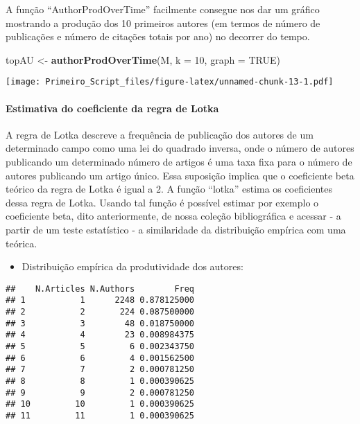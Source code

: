 \documentclass[]{article}
\newenvironment{Shaded}{\begin{snugshade}}{\end{snugshade}}
\newcommand{\DataTypeTok}[1]{\textcolor[rgb]{0.13,0.29,0.53}{#1}}
\newcommand{\DecValTok}[1]{\textcolor[rgb]{0.00,0.00,0.81}{#1}}
\newcommand{\KeywordTok}[1]{\textcolor[rgb]{0.13,0.29,0.53}{\textbf{#1}}}
\newcommand{\NormalTok}[1]{#1}
\newcommand{\OperatorTok}[1]{\textcolor[rgb]{0.81,0.36,0.00}{\textbf{#1}}}
\newcommand{\OtherTok}[1]{\textcolor[rgb]{0.56,0.35,0.01}{#1}}
\newcommand{\StringTok}[1]{\textcolor[rgb]{0.31,0.60,0.02}{#1}}
\providecommand{\tightlist}{%
  \setlength{\itemsep}{0pt}\setlength{\parskip}{0pt}}
\let\oldparagraph\paragraph
\renewcommand{\paragraph}[1]{\oldparagraph{#1}\mbox{}}
\begin{document}
A função ``AuthorProdOverTime'' facilmente consegue nos dar um gráfico
mostrando a produção dos 10 primeiros autores (em termos de número de
publicações e número de citações totais por ano) no decorrer do tempo.

\begin{Shaded}
\begin{Highlighting}[]
\NormalTok{topAU <-}\StringTok{ }\KeywordTok{authorProdOverTime}\NormalTok{(M, }\DataTypeTok{k =} \DecValTok{10}\NormalTok{, }\DataTypeTok{graph =} \OtherTok{TRUE}\NormalTok{)}
\end{Highlighting}
\end{Shaded}

\texttt{[image: Primeiro\_Script\_files/figure-latex/unnamed-chunk-13-1.pdf]}

\hypertarget{estimativa-do-coeficiente-da-regra-de-lotka}{%
\paragraph{Estimativa do coeficiente da regra de
Lotka}\label{estimativa-do-coeficiente-da-regra-de-lotka}}

A regra de Lotka descreve a frequência de publicação dos autores de um
determinado campo como uma lei do quadrado inversa, onde o número de
autores publicando um determinado número de artigos é uma taxa fixa para
o número de autores publicando um artigo único. Essa suposição implica
que o coeficiente beta teórico da regra de Lotka é igual a 2. A função
``lotka'' estima os coeficientes dessa regra de Lotka. Usando tal função
é possível estimar por exemplo o coeficiente beta, dito anteriormente,
de nossa coleção bibliográfica e acessar - a partir de um teste
estatístico - a similaridade da distribuição empírica com uma teórica.

\begin{itemize}
\tightlist
\item
  Distribuição empírica da produtividade dos autores:
\end{itemize}

\begin{Shaded}
\end{Shaded}

\begin{verbatim}
##    N.Articles N.Authors        Freq
## 1           1      2248 0.878125000
## 2           2       224 0.087500000
## 3           3        48 0.018750000
## 4           4        23 0.008984375
## 5           5         6 0.002343750
## 6           6         4 0.001562500
## 7           7         2 0.000781250
## 8           8         1 0.000390625
## 9           9         2 0.000781250
## 10         10         1 0.000390625
## 11         11         1 0.000390625
\end{verbatim}
\end{document}
